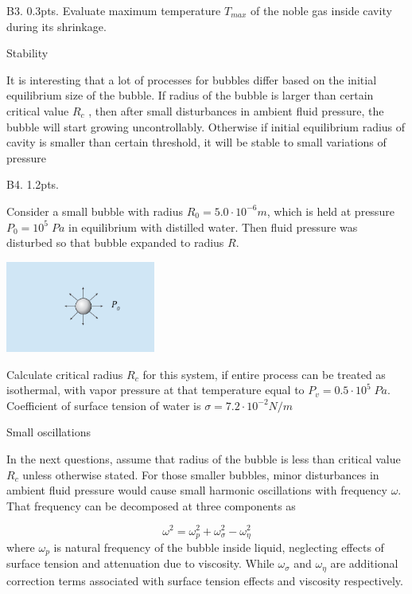 \begin{subpr}{B3. \hfill 0.3pts.} Evaluate maximum temperature ${T_{max}}$ of the noble gas inside cavity during its shrinkage.
\end{subpr}
\begin{problem}{Stability}

It is interesting that a lot of processes for bubbles differ based on the initial equilibrium size of the bubble. If radius of the bubble is larger than certain critical value $R_c$ , then after small disturbances in ambient fluid pressure, the bubble will start growing uncontrollably. Otherwise if initial equilibrium radius of cavity is smaller than certain threshold, it will be stable to small variations of pressure
\end{problem}

\begin{subpr}{B4. \hfill 1.2pts.} 

Consider a small bubble with radius ${R_0 = 5.0\cdot 10^{-6}m}$, which is held at pressure ${P_0 = 10^5\;Pa}$ in equilibrium with distilled water. Then fluid pressure was disturbed so that bubble expanded to radius ${R}$.
\begin{center}
\includegraphics[height=3cm]{Images/4_bbl_prob_Blake_pressure_unstable1.PNG}
\end{center}
Calculate critical radius ${R_c}$ for this system, if entire process can be treated as isothermal, with vapor pressure at that temperature equal to ${P_v = 0.5\cdot 10^{5}\;Pa}.$ Coefficient of surface tension of water is ${\sigma = 7.2\cdot 10^{-2}N/m}$
\end{subpr}

\begin{problem}{Small oscillations}

In the next questions, assume that radius of the bubble is less than critical value ${R_c}$ unless otherwise stated. For those smaller bubbles, minor disturbances in ambient fluid pressure would cause small harmonic oscillations with frequency ${\omega}.$ That frequency can be decomposed at three components as

$$\omega^2 = \omega_p^2 + \omega_{\sigma}^2 - \omega_{\eta}^2$$
where ${\omega_p}$ is natural frequency of the bubble inside liquid, neglecting effects of surface tension and attenuation due to viscosity. While ${\omega_{\sigma}}$ and ${\omega_{\eta}}$ are additional correction terms associated with surface tension effects and viscosity respectively.
\end{problem}

